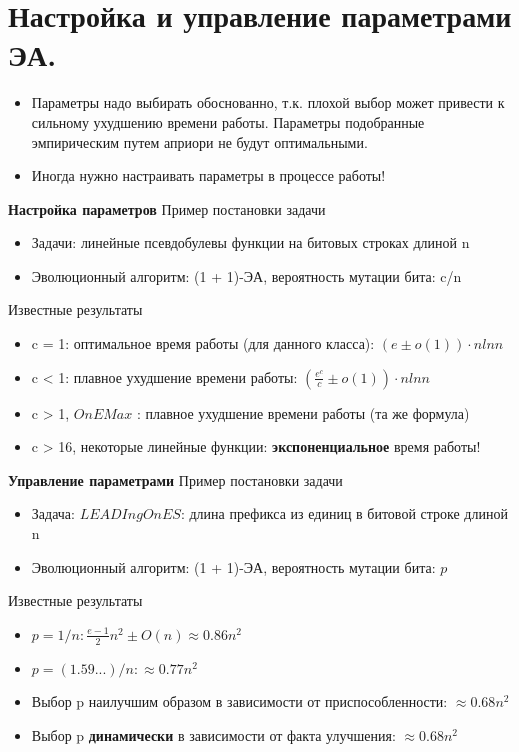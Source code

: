 \section{Настройка и управление параметрами ЭА.}

\begin{itemize}
    \item Параметры надо выбирать обоснованно, т.к. плохой выбор может привести к сильному ухудшению времени работы. Параметры подобранные эмпирическим путем априори не будут оптимальными.
    \item Иногда нужно настраивать параметры в процессе работы!
\end{itemize}

\textbf{Настройка параметров}
Пример постановки задачи
\begin{itemize}
    \item Задачи: линейные псевдобулевы функции на битовых строках длиной n 
    \item Эволюционный алгоритм: (1 + 1)-ЭА, вероятность мутации бита: c/n
\end{itemize}

Известные результаты
\begin{itemize}
    \item c = 1: оптимальное время работы (для данного класса): $(e ± o(1)) · n ln n $
    \item c < 1: плавное ухудшение времени работы: $( \frac{e^c}{c} ± o(1)) · n ln n$
    \item c > 1, $OnEMax$ : плавное ухудшение времени работы (та же формула)
    \item c > 16, некоторые линейные функции: \textbf{экспоненциальное} время работы! 
\end{itemize}


\textbf{Управление параметрами}
Пример постановки задачи
\begin{itemize}
    \item Задача: $LEADIngOnES$: длина префикса из единиц в битовой строке длиной n 
    \item Эволюционный алгоритм: (1 + 1)-ЭА, вероятность мутации бита: $p$
\end{itemize}

Известные результаты
\begin{itemize}
    \item $p = 1/n: \frac{e-1}{2} n^2 ± O(n) \approx 0.86n^2$
    \item $p = (1.59...)/n: \approx 0.77n^2$
    \item Выбор p наилучшим образом в зависимости от приспособленности: \textbf{$\approx 0.68n^2$}
    \item Выбор p \textbf{динамически} в зависимости от факта улучшения: \textbf{$\approx 0.68n^2$}
\end{itemize}


